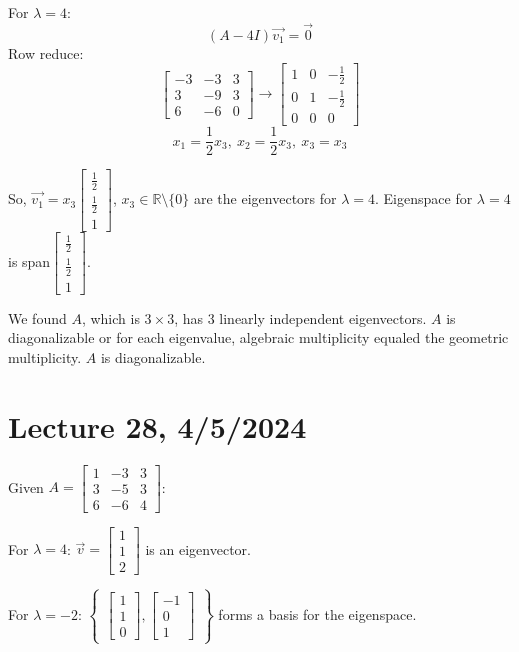\documentclass{article}
\begin{document}
For \( \lambda = 4 \): 
\[ (A-4I)\vec{v_1} = \vec{0} \]
Row reduce:
\[ \begin{bmatrix} -3 & -3 & 3 \\ 3 & -9 & 3 \\ 6 & -6 & 0 \end{bmatrix} \rightarrow \begin{bmatrix} 1 & 0 & -\frac{1}{2} \\ 0 & 1 & -\frac{1}{2} \\ 0 & 0 & 0 \end{bmatrix} \]
\[ x_1 = \frac{1}{2}x_3, \ x_2 = \frac{1}{2}x_3, \ x_3 = x_3 \]

So, \( \vec{v_1} = x_3\begin{bmatrix} \frac{1}{2} \\ \frac{1}{2} \\ 1 \end{bmatrix} \), \( x_3 \in \mathbb{R} \setminus \{0\} \) are the eigenvectors for \( \lambda = 4 \). 
Eigenspace for \( \lambda = 4 \) is span{\( \begin{bmatrix} \frac{1}{2} \\ \frac{1}{2} \\ 1 \end{bmatrix} \)}. 

We found \( A \), which is \( 3 \times 3 \), has 3 linearly independent eigenvectors. \( A \) is diagonalizable or for each eigenvalue, algebraic multiplicity equaled the geometric multiplicity. \( A \) is diagonalizable.


\section{Lecture 28, 4/5/2024}

Given \( A = \begin{bmatrix} 1 & -3 & 3 \\ 3 & -5 & 3 \\ 6 & -6 & 4 \end{bmatrix} \):

For \( \lambda = 4 \): \( \vec{v} = \begin{bmatrix} 1 \\ 1 \\ 2 \end{bmatrix} \) is an eigenvector.

For \( \lambda = -2 \): \( \begin{Bmatrix} \begin{bmatrix} 1 \\ 1 \\ 0 \end{bmatrix}, \begin{bmatrix} -1 \\ 0 \\ 1 \end{bmatrix} \end{Bmatrix} \) forms a basis for the eigenspace.
\end{document}
